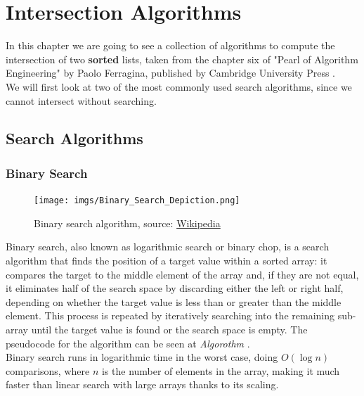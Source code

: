 \chapter{Intersection Algorithms\label{intersect}}

In this chapter we are going to see a collection of algorithms to compute the intersection of two \textbf{sorted} lists, taken from the chapter six of "Pearl of Algorithm Engineering" by Paolo Ferragina, published by Cambridge University Press \citep{Ferragina_2023}. \\
We will first look at two of the most commonly used search algorithms, since we cannot intersect without searching. \\

\section{Search Algorithms}

\subsection{Binary Search \label{sec:binsearch}}

\begin{figure}[H] 
    \begin{center}
        \texttt{[image: imgs/Binary\_Search\_Depiction.png]}
        \caption{Binary search algorithm, source: \href{https://en.wikipedia.org/wiki/Binary_search}{Wikipedia}\label{fig:binsearch}}
    \end{center}
\end{figure}

Binary search, also known as logarithmic search or binary chop, is a search algorithm that finds the position of a target value within a sorted array: it compares the target to the middle element of the array and, if they are not equal, it eliminates half of the search space by discarding either the left or right half, depending on whether the target value is less than or greater than the middle element. This process is repeated by iteratively searching into the remaining sub-array until the target value is found or the search space is empty. The pseudocode for the algorithm can be seen at \textit{Algorothm} .\\
Binary search runs in logarithmic time in the worst case, doing $O(\log n)$ comparisons, where $n$ is the number of elements in the array, making it much faster than linear search with large arrays thanks to its scaling.\\

